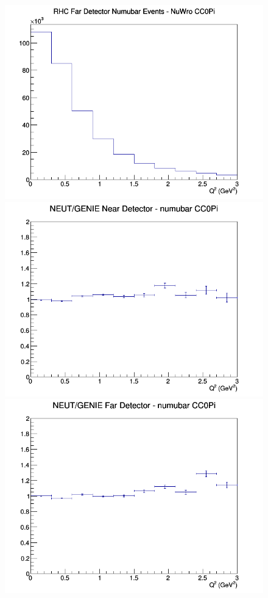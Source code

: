 \begin{figure}[h]
\endminipage
{}
\includegraphics[width=\linewidth]{Q2/nominal/CC0Pi_RHC_FD_numubar_Q2_NuWro.png}
\endminipage
\newline
{}
\includegraphics[width=\linewidth]{Q2/nominal/ratios/CC0Pi_NEUT_GENIE_numubar_near_Q2.png}
\endminipage
{}
\includegraphics[width=\linewidth]{Q2/nominal/ratios/CC0Pi_NEUT_GENIE_numubar_far_Q2.png}

\end{figure}
